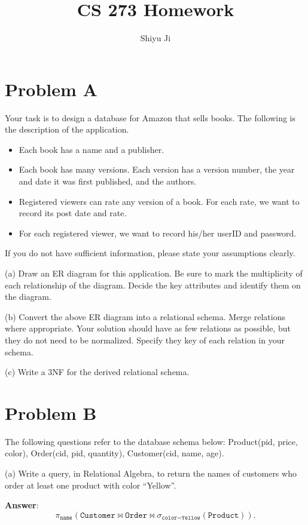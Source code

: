 \documentclass{article}
\begin{document}
\title{\bf CS 273 Homework}
\author{Shiyu Ji}
\date{}
\maketitle

\section{Problem A}
Your task is to design a database for Amazon that sells books.
The following is the description of the application.
\begin{itemize}
\item Each book has a name and a publisher.
\item Each book has many versions. Each version has a version number, the year and date it was first published, and the authors.
\item Registered viewers can rate any version of a book. For each rate, we want to record its post date and rate.
\item For each registered viewer, we want to record his/her userID and password.
\end{itemize}
If you do not have sufficient information, please state your assumptions clearly.

(a) Draw an ER diagram for this application. Be sure to mark the multiplicity of each relationship of the diagram. Decide the key attributes and identify them on the diagram.

(b) Convert the above ER diagram into a relational schema. Merge relations where appropriate. Your solution should have as few relations as possible, but they do not need to be normalized. Specify they key of each relation in your schema.

(c) Write a 3NF for the derived relational schema.

\section{Problem B}
The following questions refer to the database schema below: Product(pid, price, color), Order(cid, pid, quantity), Customer(cid, name, age).

(a) Write a query, in Relational Algebra, to return the names of customers who order at least one product with color ``Yellow''.

{\bf Answer}: $$\pi_{\texttt{name}} (\texttt{Customer} \bowtie \texttt{Order} \bowtie \sigma_{\texttt{color} = \texttt{Yellow}}(\texttt{Product})).$$
\end{document}
